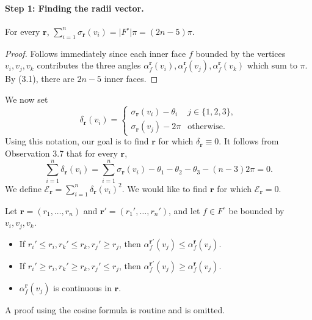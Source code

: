 \paragraph{Step 1: Finding the radii vector.}
\begin{claim}[Observation 3.7]
For every $\mathbf r$, $\sum_{i=1}^n\sigma_{\mathbf r}(v_i)=|F^\circ|\pi=(2n-5)\pi$.
\end{claim}
\begin{proof}
Follows immediately since each inner face $f$ bounded by the vertices $v_i,v_j,v_k$ contributes the three angles $\alpha_f^{\mathbf r}(v_i),\alpha_f^{\mathbf r}(v_j),\alpha_f^{\mathbf r}(v_k)$ which sum to $\pi$. By (3.1), there are $2n-5$ inner faces.
\end{proof}
We now set
\[
\delta_{\mathbf r}(v_i)=\begin{cases}\sigma_{\mathbf r}(v_i)-\theta_i&j\in\{1,2,3\},\\\sigma_{\mathbf r}(v_j)-2\pi&\text{otherwise}.\end{cases}\tag{3.3}
\]
Using this notation, our goal is to find $\mathbf r$ for which $\delta_{\mathbf r}\equiv0$. It follows from Observation 3.7 that for every $\mathbf r$,
\[
\sum_{i=1}^n\delta_{\mathbf r}(v_i)=\sum_{i=1}^n\sigma_{\mathbf r}(v_i)-\theta_1-\theta_2-\theta_3-(n-3)2\pi=0.\tag{3.4}
\]
We define $\mathcal E_{\mathbf r}=\sum_{i=1}^n\delta_{\mathbf r}(v_i)^2$. We would like to find $\mathbf r$ for which $\mathcal E_{\mathbf r}=0$.
\begin{claim}[Observation 3.8]
Let $\mathbf r=(r_1,\ldots,r_n)$ and $\mathbf r'=(r_1',\ldots,r_n')$, and let $f\in F^\circ$ be bounded by $v_i,v_j,v_k$.
\begin{itemize}
\item If $r_i'\le r_i,r_k'\le r_k,r_j'\ge r_j$, then $\alpha_f^{\mathbf r'}(v_j)\le\alpha_f^{\mathbf r}(v_j)$.
\item If $r_i'\ge r_i,r_k'\ge r_k,r_j'\le r_j$, then $\alpha_f^{\mathbf r'}(v_j)\ge\alpha_f^{\mathbf r}(v_j)$.
\item $\alpha_f^{\mathbf r}(v_j)$ is continuous in $\mathbf r$.
\end{itemize}
\end{claim}
A proof using the cosine formula is routine and is omitted.

